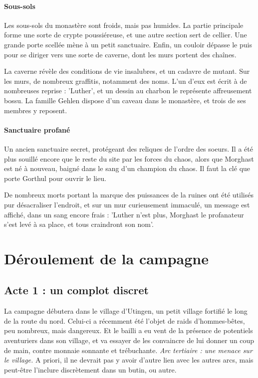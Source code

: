 \documentclass[10pt,a4paper]{book}
\begin{document}
\subsubsection{Sous-sols}
Les sous-sols du monastère sont froids, mais pas humides. La partie principale forme une sorte de crypte poussiéreuse, et une autre section sert de cellier. Une grande porte scellée mène à un petit sanctuaire. Enfin, un couloir dépasse le puis pour se diriger vers une sorte de caverne, dont les murs portent des chaînes.

La caverne révèle des conditions de vie insalubres, et un cadavre de mutant. Sur les murs, de nombreux graffitis, notamment des noms. L'un d'eux est écrit à de nombreuses reprise : 'Luther', et un dessin au charbon le représente affreusement bossu. La famille Gehlen dispose d'un caveau dans le monastère, et trois de ses membres y reposent.
\subsubsection{Sanctuaire profané}
Un ancien  sanctuaire secret, protégeant des reliques de l'ordre des soeurs. Il a été plus souillé encore que le reste du site par les forces du chaos, alors que Morghast est né à nouveau, baigné dans le sang d'un champion du chaos. Il faut la clé que porte Gorthul pour ouvrir le lieu.

De nombreux morts portant la marque des puissances de la ruines ont été utilisés pur désacraliser l'endroit, et sur un mur curieusement immaculé, un message est affiché, dans un sang encore frais : 'Luther n'est plus, Morghast le profanateur s'est levé à sa place, et tous craindront son nom'.
\chapter{Déroulement de la campagne}
\section{Acte 1 : un complot discret}
La campagne débutera dans le village d'Utingen, un petit village fortifié le long de la route du nord. Celui-ci a récemment été l'objet de raids d'hommes-bêtes, peu nombreux, mais dangereux. Et le bailli a eu vent de la présence de potentiels aventuriers dans son village, et va essayer de les convaincre de lui donner un coup de main, contre monnaie sonnante et trébuchante. \emph{Arc tertiaire : une menace sur le village.} A priori, il ne devrait pas y avoir d'autre lien avec les autres arcs, mais peut-être l'inclure discrètement dans un butin, ou autre. 
\end{document}
